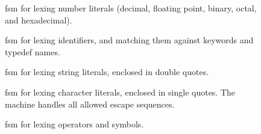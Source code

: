 \documentclass[../00-main.tex]{subfiles}
\begin{document}
\begin{figure}[p]
  \centering
  \caption{\Acrlong{fsm} for lexing number literals (decimal, floating point, binary, octal, and hexadecimal).}
  \label{app:fig:lexing numbers fsm} %
\end{figure}

\begin{figure}[p]
  \centering
  \caption{\Acrlong{fsm} for lexing identifiers, and matching them against keywords and typedef names.}
  \label{app:fig:lexing identifiers fsm} %
\end{figure}

\begin{figure}[p]
  \centering
  \caption{\Acrlong{fsm} for lexing string literals, enclosed in double quotes.}
  \label{app:fig:lexing strings fsm} %
\end{figure}

\begin{figure}[p]
  \centering
  \caption{\Acrlong{fsm} for lexing character literals, enclosed in single quotes. The machine handles all allowed escape sequences.}
  \label{app:fig:lexing chars fsm} %
\end{figure}

\begin{figure}[p]
  \centering
  \caption{\Acrlong{fsm} for lexing operators and symbols.}
  \label{app:fig:lexing operators fsm} %
\end{figure}
\end{document}
